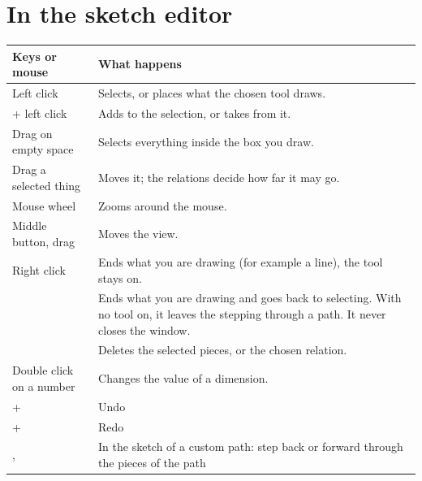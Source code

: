 \section{In the sketch editor}
\begin{center}
\begin{tabularx}{0.9\textwidth}{@{}l Y@{}}
\toprule
\textbf{Keys or mouse} & \textbf{What happens} \\
\midrule
Left click & Selects, or places what the chosen tool draws. \\
 + left click & Adds to the selection, or takes from it. \\
Drag on empty space & Selects everything inside the box you draw. \\
Drag a selected thing & Moves it; the relations decide how far it may go. \\
Mouse wheel & Zooms around the mouse. \\
Middle button, drag & Moves the view. \\
Right click & Ends what you are drawing (for example a line), the tool stays on. \\
 & Ends what you are drawing and goes back to selecting. With no tool on, it leaves the stepping through a path. It never closes the window. \\
 & Deletes the selected pieces, or the chosen relation. \\
Double click on a number & Changes the value of a dimension. \\
+ & Undo \\
+ & Redo \\
,  & In the sketch of a custom path: step back or forward through the pieces of the path \\
\bottomrule
\end{tabularx}
\end{center}
